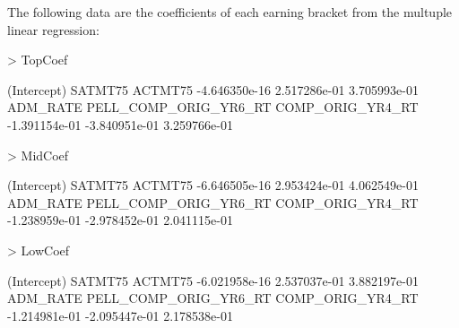 \documentclass{article}
\begin{document}
The following data are the coefficients of each earning bracket from the multuple linear regression:
\begin{Schunk}
\begin{Sinput}
> TopCoef
\end{Sinput}
\begin{Soutput}
          (Intercept)               SATMT75               ACTMT75 
        -4.646350e-16          2.517286e-01          3.705993e-01 
             ADM_RATE PELL_COMP_ORIG_YR6_RT      COMP_ORIG_YR4_RT 
        -1.391154e-01         -3.840951e-01          3.259766e-01 
\end{Soutput}
\begin{Sinput}
> MidCoef
\end{Sinput}
\begin{Soutput}
          (Intercept)               SATMT75               ACTMT75 
        -6.646505e-16          2.953424e-01          4.062549e-01 
             ADM_RATE PELL_COMP_ORIG_YR6_RT      COMP_ORIG_YR4_RT 
        -1.238959e-01         -2.978452e-01          2.041115e-01 
\end{Soutput}
\begin{Sinput}
> LowCoef
\end{Sinput}
\begin{Soutput}
          (Intercept)               SATMT75               ACTMT75 
        -6.021958e-16          2.537037e-01          3.882197e-01 
             ADM_RATE PELL_COMP_ORIG_YR6_RT      COMP_ORIG_YR4_RT 
        -1.214981e-01         -2.095447e-01          2.178538e-01 
\end{Soutput}
\end{Schunk}
\end{document}
